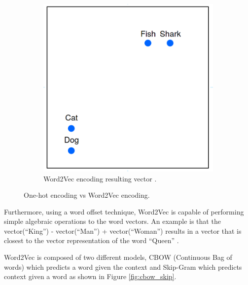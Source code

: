 \begin{figure}[H]
\begin{subfigure}{0.32\textwidth}
            \end{subfigure}
            \begin{subfigure}{0.32\textwidth}
            \includegraphics[width=\textwidth]{Sections/3StateOfTheArt/3_images/word2vec_encode.png}\hfill
            \caption[Word2Vec encoding resulting vector]{Word2Vec encoding resulting vector \cite{word2vec_explained}. }
            \end{subfigure}
            \caption[One-hot encoding vs Word2Vec encoding.]{One-hot encoding vs Word2Vec encoding.}
            \label{fig:one_vs_word2vec}

          \end{figure}

          Furthermore, using a word offset technique, Word2Vec is capable of performing simple algebraic operations to the word vectors. An example is that the vector(``King”) - vector(``Man”) + vector(``Woman”) results in a vector that is closest to the vector representation of the word ``Queen” \cite{Mikolov2013}. 

        
        Word2Vec is composed of two different models, CBOW (Continuous Bag of words) which predicts a word given the context and Skip-Gram which predicts context given a word \cite{Mikolov2013} \cite{Wiki} as shown in Figure \ref{fig:cbow_skip}.

        

